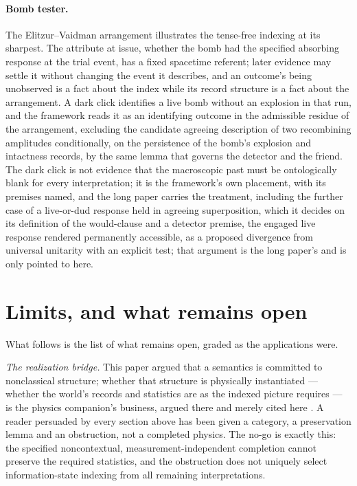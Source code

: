 \paragraph{Bomb tester.} The Elitzur--Vaidman arrangement \cite{elitzur1993quantum} illustrates the tense-free indexing at its sharpest. The attribute at issue, whether the bomb had the specified absorbing response at the trial event, has a fixed spacetime referent; later evidence may settle it without changing the event it describes, and an outcome's being unobserved is a fact about the index while its record structure is a fact about the arrangement. A dark click identifies a live bomb without an explosion in that run, and the framework reads it as an identifying outcome in the admissible residue of the arrangement, excluding the candidate agreeing description of two recombining amplitudes conditionally, on the persistence of the bomb's explosion and intactness records, by the same lemma that governs the detector and the friend. The dark click is not evidence that the macroscopic past must be ontologically blank for every interpretation; it is the framework's own placement, with its premises named, and the long paper carries the treatment, including the further case of a live-or-dud response held in agreeing superposition, which it decides on its definition of the would-clause and a detector premise, the engaged live response rendered permanently accessible, as a proposed divergence from universal unitarity with an explicit test; that argument is the long paper's and is only pointed to here.


\section{Limits, and what remains open}\label{sec:limits}

What follows is the list of what remains open, graded as the applications were.

\emph{The realization bridge.} This paper argued that a semantics is committed to nonclassical structure; whether that structure is physically instantiated --- whether the world's records and statistics are as the indexed picture requires --- is the physics companion's business, argued there and merely cited here \cite{AethusQuant, AethusBrief}. A reader persuaded by every section above has been given a category, a preservation lemma and an obstruction, not a completed physics. The no-go is exactly this: the specified noncontextual, measurement-independent completion cannot preserve the required statistics, and the obstruction does not uniquely select information-state indexing from all remaining interpretations.

